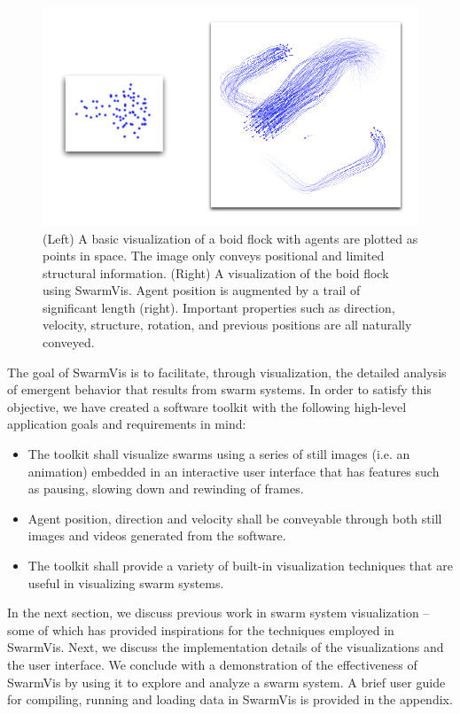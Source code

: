 \documentclass[conference]{IEEEtran}
\begin{document}
\begin{figure}[ht]
\centering
\includegraphics[scale=.55]{images/intro.pdf}
\caption{(Left) A basic visualization of a boid flock with agents are plotted as
points in space. The image only conveys positional and limited structural information.
(Right) A visualization of the boid flock using SwarmVis. Agent
position is augmented by a trail of significant length (right).
Important properties such as direction, velocity, structure, rotation,
and previous positions are all naturally conveyed.
}
\label{Intro}
\end{figure}

The goal of SwarmVis is to facilitate, through visualization, the detailed analysis of emergent behavior that results from swarm systems.
In order to satisfy this objective, we have created a software toolkit
with the following high-level application goals and requirements in mind:
\begin{itemize}
\item The toolkit shall visualize swarms using a series of still images (i.e. an animation)
embedded in an interactive user interface that has features such as pausing, slowing down and rewinding of frames.
\item Agent position, direction and velocity shall be conveyable through both still images and videos generated from the software.
\item The toolkit shall provide a variety of built-in visualization techniques that are useful in visualizing swarm systems.
\end{itemize}

In the next section, we discuss previous work in swarm system visualization --
some of which has provided inspirations for the techniques employed in SwarmVis.
Next, we discuss the implementation details of the visualizations and the user interface.
We conclude with a demonstration of the effectiveness of SwarmVis by using it to explore and analyze a swarm system.
A brief user guide for compiling, running and loading data in SwarmVis is provided in the appendix.
\end{document}
